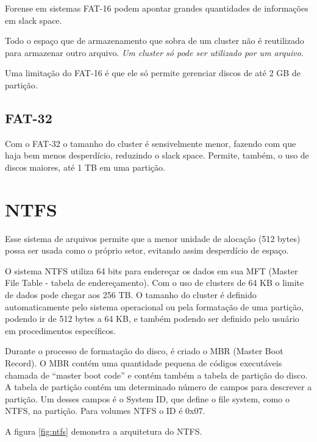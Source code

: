 \begin{citacao}
  Forense em sistemas FAT-16 podem apontar grandes quantidades de informações em slack space.
\end{citacao}

Todo o espaço que de armazenamento que sobra de um cluster não é reutilizado para armazenar outro arquivo. \emph{Um cluster só pode ser utilizado por um arquivo.}

Uma limitação do FAT-16 é que ele só permite gerenciar discos de até 2 GB de partição.

\subsection{FAT-32}

Com o FAT-32 o tamanho do cluster é sensivelmente menor, fazendo com que haja bem menos desperdício, reduzindo o slack space. Permite, também, o uso de discos maiores, até 1 TB em uma partição.

\section{NTFS}

Esse sistema de arquivos permite que a menor unidade de alocação (512 bytes) possa ser usada como o próprio setor, evitando assim desperdício de espaço.

O sistema NTFS utiliza 64 bits para endereçar os dados em sua MFT (Master File Table - tabela de endereçamento). Com o uso de clusters de 64 KB o limite de dados pode chegar aos 256 TB. O tamanho do cluster é definido automaticamente pelo sistema operacional ou pela formatação de uma partição, podendo ir de 512 bytes a 64 KB, e também podendo ser definido pelo usuário em procedimentos específicos.

\begin{citacao}
  Durante o processo de formatação do disco, é criado o MBR (Master Boot Record). O MBR contém uma quantidade pequena de códigos executáveis chamada de ``master boot code'' e contém também a tabela de partição do disco. A tabela de partição contém um determinado número de campos para descrever a partição. Um desses campos é o System ID, que define o file system, como o NTFS, na partição. Para volumes NTFS o ID é 0x07. 
\end{citacao}

A figura \ref{fig:ntfs} demonstra a arquitetura do NTFS.

